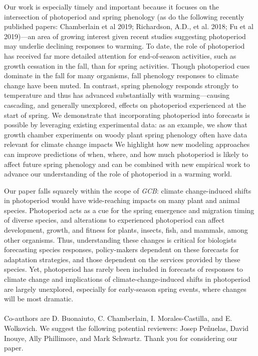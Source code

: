 \documentclass[10.7pt,a4paper]{letter} %
\begin{document}
\begin{letter}{}
Our work is especially timely and important because it focuses on the intersection of photoperiod and spring phenology (as do the following recently published papers: Chamberlain et al 2019; Richardson, A.D., et al. 2018; Fu et al 2019)---an area of growing interest given recent studies suggesting photoperiod may underlie declining responses to warming. To date, the role of photoperiod has received far more detailed attention for end-of-season activities, such as growth cessation in the fall, than for spring activities. Though photoperiod cues dominate in the fall for many organisms, fall phenology responses to climate change have been muted. In contrast, spring phenology responds strongly to temperature and thus has advanced substantially with warming---causing cascading, and generally unexplored, effects on photoperiod experienced at the start of spring. We demonstrate that incorporating photoperiod into forecasts is possible by leveraging existing experimental data: as an example, we show that growth chamber experiments on woody plant spring phenology often have data relevant for climate change impacts %
We highlight how new modeling approaches can improve predictions of when, where, and how much photoperiod is likely to affect future spring phenology and can be combined with new empirical work to advance our understanding of the role of photoperiod in a warming world. %

Our paper falls squarely within the scope of \emph{GCB}: climate change-induced shifts in photoperiod would have wide-reaching impacts on many plant and animal species. Photoperiod acts as a cue for the spring emergence and migration timing of diverse species, and alterations to experienced photoperiod can affect development, growth, and fitness for plants, insects, fish, and mammals, among other organisms. Thus, understanding these changes is critical for biologists forecasting species responses, policy-makers dependent on these forecasts for adaptation strategies, and those dependent on the services provided by these species. Yet, photoperiod has rarely been included in forecasts of responses to climate change and implications of climate-change-induced shifts in photoperiod are largely unexplored, especially for early-season spring events, where changes will be most dramatic. 
\\
\\
Co-authors are D. Buonaiuto, C. Chamberlain, I. Morales-Castilla, and E. Wolkovich. We suggest the following potential reviewers: Josep Pe\~nuelas, David Inouye, Ally Phillimore, and Mark Schwartz.
Thank you for considering our paper.


\end{letter}
\end{document}
